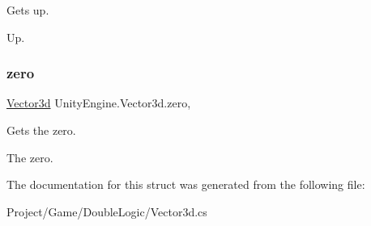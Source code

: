 Gets up. 

Up.\mbox{\label{struct_unity_engine_1_1_vector3d_af21fc14abc86a1564b9d2975d7df5b5e}} 
\subsubsection{\texorpdfstring{zero}{zero}}
{\footnotesize\ttfamily \hyperlink{struct_unity_engine_1_1_vector3d}{Vector3d} Unity\+Engine.\+Vector3d.\+zero\hspace{0.3cm}{\ttfamily [static]}, {\ttfamily [get]}}



Gets the zero. 

The zero.

The documentation for this struct was generated from the following file\+:\begin{DoxyCompactItemize}
\item 
Project/\+Game/\+Double\+Logic/Vector3d.\+cs\end{DoxyCompactItemize}
